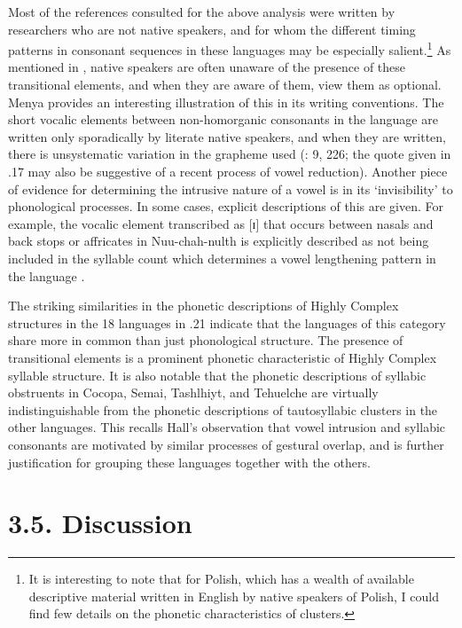   Most of the references consulted for the above analysis were written by researchers who are not native speakers, and for whom the different timing patterns in consonant sequences in these languages may be especially salient.\footnote{ \textrm{It is interesting to note that for Polish, which has a wealth of available descriptive material written in English by native speakers of Polish, I could find few details on the phonetic characteristics of clusters.}} As mentioned in , native speakers are often unaware of the presence of these transitional elements, and when they are aware of them, view them as optional. Menya provides an interesting illustration of this in its writing conventions. The short vocalic elements between non-homorganic consonants in the language are written only sporadically by literate native speakers, and when they are written, there is unsystematic variation in the grapheme used (\citealt{Whitehead2004}: 9, 226; the quote given in .17 may also be suggestive of a recent process of vowel reduction). Another piece of evidence for determining the intrusive nature of a vowel is in its ‘invisibility’ to phonological processes. In some cases, explicit descriptions of this are given. For example, the vocalic element transcribed as [ɪ] that occurs between nasals and back stops or affricates in Nuu-chah-nulth is explicitly described as not being included in the syllable count which determines a vowel lengthening pattern in the language \citep[27]{Rose1981}.



  The striking similarities in the phonetic descriptions of Highly Complex structures in the 18 languages in .21 indicate that the languages of this category share more in common than just phonological structure. The presence of transitional elements is a prominent phonetic characteristic of Highly Complex syllable structure. It is also notable that the phonetic descriptions of syllabic obstruents in Cocopa, Semai, Tashlhiyt, and Tehuelche are virtually indistinguishable from the phonetic descriptions of tautosyllabic clusters in the other languages. This recalls Hall’s observation that vowel intrusion and syllabic consonants are motivated by similar processes of gestural overlap, and is further justification for grouping these languages together with the others.


\section{3.5. Discussion}

